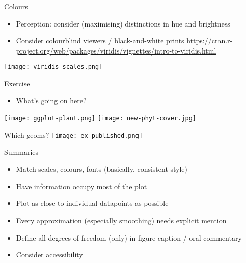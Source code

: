 \documentclass[10pt]{beamer}
\begin{document}
\begin{frame}{Colours}
   \begin{itemize}
   \item Perception: consider (maximising) distinctions in hue and brightness
     \item Consider colourblind viewers / black-and-white prints \url{https://cran.r-project.org/web/packages/viridis/vignettes/intro-to-viridis.html}
     \end{itemize}
   \texttt{[image: viridis-scales.png]}
\end{frame}

\begin{frame}{Exercise}
  \begin{itemize}
  \item What's going on here?
    \end{itemize}
  \texttt{[image: ggplot-plant.png]}   \texttt{[image: new-phyt-cover.jpg]}
\end{frame}

\begin{frame}{Which geoms?}
  \texttt{[image: ex-published.png]}
\end{frame}

\begin{frame}{Summaries}
    \begin{itemize}
    \item Match scales, colours, fonts (basically, consistent style)
    \item Have information occupy most of the plot
    \item Plot as close to individual datapoints as possible
    \item Every approximation (especially smoothing) needs explicit mention
    \item Define all degrees of freedom (only) in figure caption / oral commentary
    \item Consider accessibility
    \end{itemize}
\end{frame}
\end{document}
